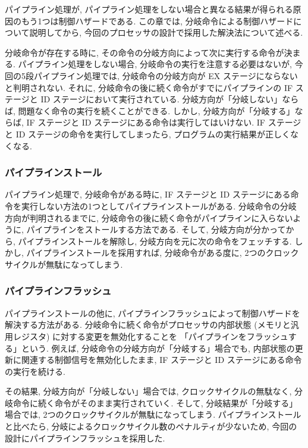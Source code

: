 \documentclass[../specifications.tex]{subfiles}
\begin{document}
  パイプライン処理が, 
  パイプライン処理をしない場合と異なる結果が得られる原因のもう1つは制御ハザードである.
  この章では, 分岐命令による制御ハザードについて説明してから, 
  今回のプロセッサの設計で採用した解決法について述べる.

  分岐命令が存在する時に, その命令の分岐方向によって次に実行する命令が決まる.
  パイプライン処理をしない場合, 分岐命令の実行を注意する必要はないが, 
  今回の5段パイプライン処理では, 分岐命令の分岐方向が EX ステージにならないと判明されない.
  それに, 分岐命令の後に続く命令がすでにパイプラインの IF ステージと ID ステージにおいて実行されている.
  分岐方向が「分岐しない」ならば, 問題なく命令の実行を続くことができる.
  しかし, 分岐方向が「分岐する」ならば, IF ステージと ID ステージにある命令は実行してはいけない.
  IF ステージと ID ステージの命令を実行してしまったら, プログラムの実行結果が正しくなくなる.

  \subsubsection{パイプラインストール}
  パイプライン処理で, 分岐命令がある時に, 
  IF ステージと ID ステージにある命令を実行しない方法の1つとしてパイプラインストールがある.
  分岐命令の分岐方向が判明されるまでに, 分岐命令の後に続く命令がパイプラインに入らないように, 
  パイプラインをストールする方法である.
  そして, 分岐方向が分かってから, パイプラインストールを解除し, 
  分岐方向を元に次の命令をフェッチする.
  しかし, パイプラインストールを採用すれば, 分岐命令がある度に,
  2つのクロックサイクルが無駄になってしまう.

  \subsubsection{パイプラインフラッシュ}
  パイプラインストールの他に, パイプラインフラッシュによって制御ハザードを解決する方法がある.
  分岐命令に続く命令がプロセッサの内部状態 (メモリと汎用レジスタ) に対する変更を無効化することを
  「パイプラインをフラッシュする」という.
  例えば, 分岐命令の分岐方向が「分岐する」場合でも, 
  内部状態の更新に関連する制御信号を無効化したまま, 
  IF ステージと ID ステージにある命令の実行を続ける.

  その結果, 分岐方向が「分岐しない」場合では, クロックサイクルの無駄なく, 
  分岐命令に続く命令がそのまま実行されていく.
  そして, 分岐結果が「分岐する」場合では, 2つのクロックサイクルが無駄になってしまう.
  パイプラインストールと比べたら, 分岐によるクロックサイクル数のペナルティが少ないため, 
  今回の設計にパイプラインフラッシュを採用した.
\end{document}
